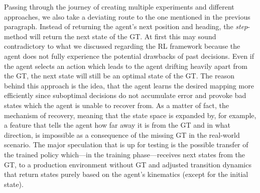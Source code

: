 Passing through the journey of creating multiple experiments and different approaches, we also take a deviating route to the one mentioned in the previous paragraph. Instead of returning the agent's next position and heading, the \textit{step}-method will return the next state of the GT. At first this may sound contradictory to what we discussed regarding the RL framework because the agent does not fully experience the potential drawbacks of past decisions. Even if the agent selects an action which leads to the agent drifting heavily apart from the GT, the next state will still be an optimal state of the GT. The reason behind this approach is the idea, that the agent learns the desired mapping more efficiently since suboptimal decisions do not accumulate error and provoke bad states which the agent is unable to recover from. As a matter of fact, the mechanism of recovery, meaning that the state space is expanded by, for example, a feature that tells the agent how far away it is from the GT and in what direction, is impossible as a consequence of the missing GT in the real-world scenario. The major speculation that is up for testing is the possible transfer of the trained policy which—in the training phase—receives next states from the GT, to a production environment without GT and adjusted transition dynamics that return states purely based on the agent's kinematics (except for the initial state).